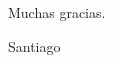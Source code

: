 


\begin{acknowledgements} 

Muchas gracias.\\


\begin{flushright}

Santiago

\monthname \ \the\year







\end{flushright}



\end{acknowledgements}



